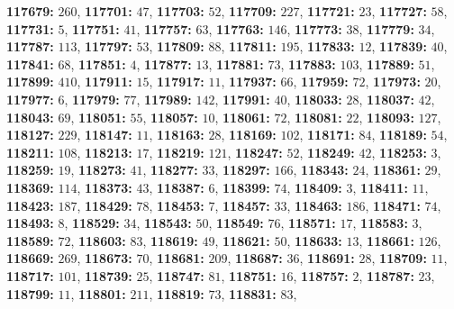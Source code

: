 \textsf{\bfseries 117679:} $260$, \textsf{\bfseries 117701:} $47$, \textsf{\bfseries 117703:} $52$, \textsf{\bfseries 117709:} $227$, \textsf{\bfseries 117721:} $23$, \textsf{\bfseries 117727:} $58$, \textsf{\bfseries 117731:} $5$, \textsf{\bfseries 117751:} $41$, \textsf{\bfseries 117757:} $63$, \textsf{\bfseries 117763:} $146$, \textsf{\bfseries 117773:} $38$, \textsf{\bfseries 117779:} $34$, \textsf{\bfseries 117787:} $113$, \textsf{\bfseries 117797:} $53$, \textsf{\bfseries 117809:} $88$, \textsf{\bfseries 117811:} $195$, \textsf{\bfseries 117833:} $12$, \textsf{\bfseries 117839:} $40$, \textsf{\bfseries 117841:} $68$, \textsf{\bfseries 117851:} $4$, \textsf{\bfseries 117877:} $13$, \textsf{\bfseries 117881:} $73$, \textsf{\bfseries 117883:} $103$, \textsf{\bfseries 117889:} $51$, \textsf{\bfseries 117899:} $410$, \textsf{\bfseries 117911:} $15$, \textsf{\bfseries 117917:} $11$, \textsf{\bfseries 117937:} $66$, \textsf{\bfseries 117959:} $72$, \textsf{\bfseries 117973:} $20$, \textsf{\bfseries 117977:} $6$, \textsf{\bfseries 117979:} $77$, \textsf{\bfseries 117989:} $142$, \textsf{\bfseries 117991:} $40$, \textsf{\bfseries 118033:} $28$, \textsf{\bfseries 118037:} $42$, \textsf{\bfseries 118043:} $69$, \textsf{\bfseries 118051:} $55$, \textsf{\bfseries 118057:} $10$, \textsf{\bfseries 118061:} $72$, \textsf{\bfseries 118081:} $22$, \textsf{\bfseries 118093:} $127$, \textsf{\bfseries 118127:} $229$, \textsf{\bfseries 118147:} $11$, \textsf{\bfseries 118163:} $28$, \textsf{\bfseries 118169:} $102$, \textsf{\bfseries 118171:} $84$, \textsf{\bfseries 118189:} $54$, \textsf{\bfseries 118211:} $108$, \textsf{\bfseries 118213:} $17$, \textsf{\bfseries 118219:} $121$, \textsf{\bfseries 118247:} $52$, \textsf{\bfseries 118249:} $42$, \textsf{\bfseries 118253:} $3$, \textsf{\bfseries 118259:} $19$, \textsf{\bfseries 118273:} $41$, \textsf{\bfseries 118277:} $33$, \textsf{\bfseries 118297:} $166$, \textsf{\bfseries 118343:} $24$, \textsf{\bfseries 118361:} $29$, \textsf{\bfseries 118369:} $114$, \textsf{\bfseries 118373:} $43$, \textsf{\bfseries 118387:} $6$, \textsf{\bfseries 118399:} $74$, \textsf{\bfseries 118409:} $3$, \textsf{\bfseries 118411:} $11$, \textsf{\bfseries 118423:} $187$, \textsf{\bfseries 118429:} $78$, \textsf{\bfseries 118453:} $7$, \textsf{\bfseries 118457:} $33$, \textsf{\bfseries 118463:} $186$, \textsf{\bfseries 118471:} $74$, \textsf{\bfseries 118493:} $8$, \textsf{\bfseries 118529:} $34$, \textsf{\bfseries 118543:} $50$, \textsf{\bfseries 118549:} $76$, \textsf{\bfseries 118571:} $17$, \textsf{\bfseries 118583:} $3$, \textsf{\bfseries 118589:} $72$, \textsf{\bfseries 118603:} $83$, \textsf{\bfseries 118619:} $49$, \textsf{\bfseries 118621:} $50$, \textsf{\bfseries 118633:} $13$, \textsf{\bfseries 118661:} $126$, \textsf{\bfseries 118669:} $269$, \textsf{\bfseries 118673:} $70$, \textsf{\bfseries 118681:} $209$, \textsf{\bfseries 118687:} $36$, \textsf{\bfseries 118691:} $28$, \textsf{\bfseries 118709:} $11$, \textsf{\bfseries 118717:} $101$, \textsf{\bfseries 118739:} $25$, \textsf{\bfseries 118747:} $81$, \textsf{\bfseries 118751:} $16$, \textsf{\bfseries 118757:} $2$, \textsf{\bfseries 118787:} $23$, \textsf{\bfseries 118799:} $11$, \textsf{\bfseries 118801:} $211$, \textsf{\bfseries 118819:} $73$, \textsf{\bfseries 118831:} $83$, 
